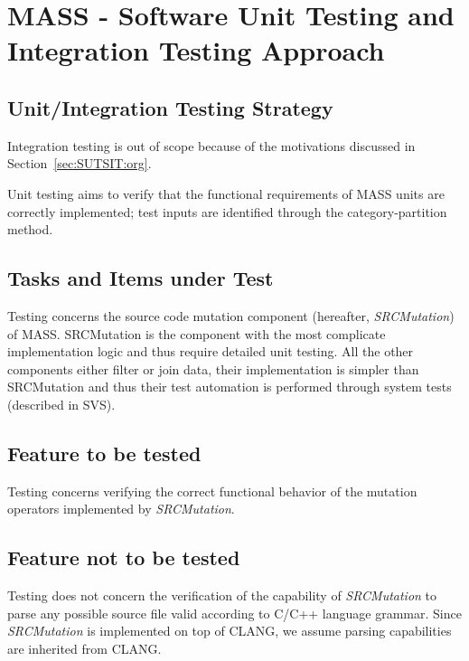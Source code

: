 
\chapter{MASS - Software Unit Testing and Integration Testing Approach}


\section{Unit/Integration Testing Strategy}

Integration testing is out of scope because of the motivations discussed in Section~\ref{sec:SUTSIT:org}.

Unit testing aims to verify that the functional requirements of MASS units are correctly implemented; test inputs are identified through the category-partition method.


\section{Tasks and Items under Test}

Testing concerns the source code mutation component (hereafter, \emph{SRCMutation}) of MASS.
SRCMutation is the component with the most complicate implementation logic and thus require detailed unit testing.
All the other components either filter or join data, their implementation is simpler than SRCMutation and thus their test automation is performed through system tests (described in SVS).

\section{Feature to be tested}

Testing concerns verifying the correct functional behavior of the mutation operators implemented by \emph{SRCMutation}.

\section{Feature not to be tested}

Testing does not concern the verification of the capability of \emph{SRCMutation} to parse any possible source file valid according to C/C++ language grammar. Since \emph{SRCMutation} is implemented on top of CLANG, we assume parsing capabilities are inherited from CLANG.



